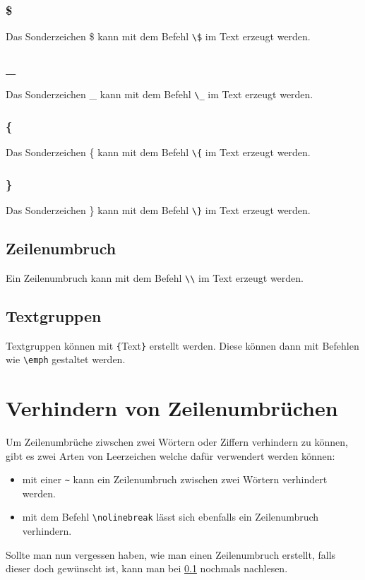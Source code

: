 \documentclass[
12pt,
ngerman
]{scrreprt}
\begin{document}
\subsubsection{\$}
Das Sonderzeichen \$ kann mit dem Befehl \verb!\$! im Text erzeugt werden.

\subsubsection{\_}
Das Sonderzeichen \_ kann mit dem Befehl \verb!\_! im Text erzeugt werden.

\subsubsection{\{}
Das Sonderzeichen \{ kann mit dem Befehl \verb!\{! im Text erzeugt werden.

\subsubsection{\}}
Das Sonderzeichen \} kann mit dem Befehl \verb!\}! im Text erzeugt werden.

\subsection{Zeilenumbruch}
\label{subsec:linebreak}
Ein Zeilenumbruch kann mit dem Befehl \verb!\\! im Text erzeugt werden.

\subsection{Textgruppen}
\label{subsec:textgroups}
Textgruppen können mit \verb!{!Text\verb!}! erstellt werden. Diese können dann mit Befehlen wie \verb!\emph! gestaltet werden.

\section{Verhindern von Zeilenumbrüchen}
\label{sec:no-linebreak}
Um Zeilenumbrüche ziwschen zwei Wörtern oder Ziffern verhindern zu können, gibt es zwei Arten von Leerzeichen welche dafür verwendert werden können:
\begin{itemize}
  \item mit einer \verb!~! kann ein Zeilenumbruch zwischen zwei Wörtern verhindert werden.
  \item mit dem Befehl \verb!\nolinebreak! lässt sich ebenfalls ein Zeilenumbruch verhindern.
\end{itemize}
Sollte man nun vergessen haben, wie man einen Zeilenumbruch erstellt, falls dieser doch gewünscht ist, kann man bei \cref{subsec:linebreak} nochmals nachlesen.
\end{document}
